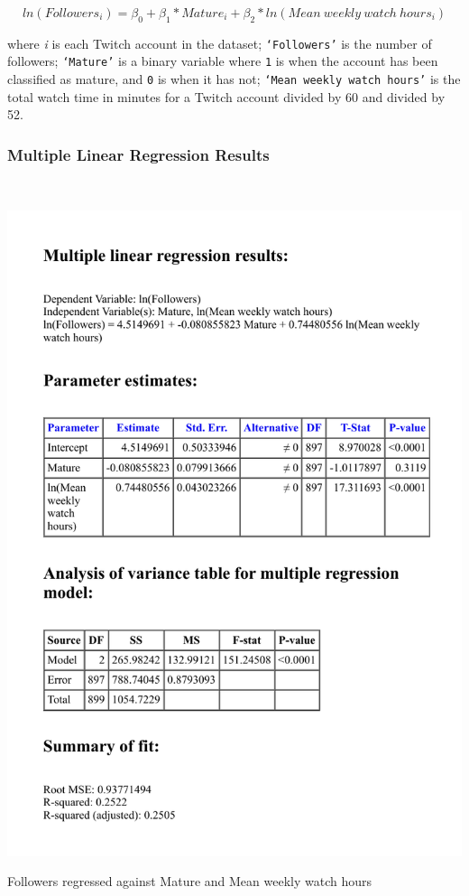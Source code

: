 \documentclass[12pt]{article}
\begin{document}
\begin{equation}
ln(Followers_{i}) = \beta_{0} + \beta_{1} \ast Mature_{i} + \beta_{2} \ast ln(Mean\ weekly\ watch\ hours_{i})
\label{eq:multi_linear_model}
\end{equation}

where \emph{i} is each Twitch account in the dataset; \texttt{`Followers'} is the number of followers; \texttt{`Mature'} is a binary variable where \texttt{1} is when the account has been classified as mature, and \texttt{0} is when it has not; \texttt{`Mean weekly watch hours'} is the total watch time in minutes for a Twitch account divided by 60 and divided by 52.

\subsubsection{Multiple Linear Regression Results}\

\begin{table}[H]
  \centering %
  \includegraphics[scale = 0.7]{../StatCrunch_Results/followers_mature_watch_hrs/multi_regression_table}
  \captionsetup{justification=centering, singlelinecheck=false, margin=2cm}
  \caption[Multiple Linear Regression for Followers by Mature]{Followers regressed against Mature and Mean weekly watch hours}
  \label{tab:multi_regression_tab}
\end{table}
\end{document}
